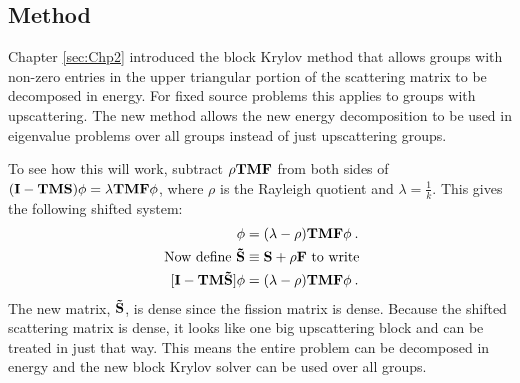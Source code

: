 \subsection{Method}
Chapter \ref{sec:Chp2} introduced the block Krylov method that allows groups with non-zero entries in the upper triangular portion of the scattering matrix to be decomposed in energy. For fixed source problems this applies to groups with upscattering. The new method allows the new energy decomposition to be used in eigenvalue problems over all groups instead of just upscattering groups.

To see how this will work, subtract $\rho \mathbf{TMF}$ from both sides of $(\mathbf{I} - \mathbf{TMS})\phi = \lambda \mathbf{TMF}\phi$, where $\rho$ is the Rayleigh quotient and $\lambda = \frac{1}{k}$. This gives the following shifted system:
%
\begin{align}
  [\ve{I} - \ve{TM}(\ve{S} + \rho\ve{F})]\phi &=( \lambda - \rho) \ve{TMF} \phi \:. \\
  \text{ Now define } \ve{\tilde{S}} &\equiv \ve{S} + \rho\ve{F} \text{ to write} \nonumber \\
   [\ve{I} - \ve{TM\tilde{S}}]\phi &=( \lambda - \rho) \ve{TMF} \phi \:.
    \label{eq:OperatorShiftedEval}
\end{align}
%
The new matrix, $\mathbf{\tilde{S}}$, is dense since the fission matrix is dense. Because the shifted scattering matrix is dense, it looks like one big upscattering block and can be treated in just that way. This means the entire problem can be decomposed in energy and the new block Krylov solver can be used over all groups.

